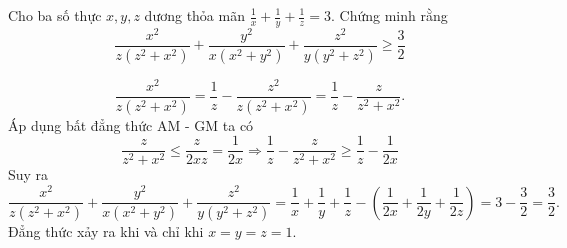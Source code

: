 \begin{problem}
	Cho ba số thực $x, y, z$ dương thỏa mãn $\displaystyle \frac{1}{x} + \frac{1}{y} + \frac{1}{z} = 3$. Chứng minh rằng
	\[
		\frac{x^2}{z(z^2 + x^2)} + \frac{y^2}{x(x^2+ y^2)} + \frac{z^2}{y(y^2 + z^2)} \ge \frac{3}{2}
	\]
	\solution

	\[
		\frac{x^2}{z(z^2 + x^2)} = \frac{1}{z} - \frac{z^2}{z(z^2 + x^2)} = \frac{1}{z} - \frac{z}{z^2 + x^2}.
	\]
	Áp dụng bất đẳng thức AM - GM ta có
	\[
		\frac{z}{z^2 + x^2} \le \frac{z}{2xz} = \frac{1}{2x} \Rightarrow 
		\frac{1}{z} - \frac{z}{z^2 + x^2} \ge \frac{1}{z} - \frac{1}{2x}
	\]
	Suy ra
	\[
		\frac{x^2}{z(z^2 + x^2)} + \frac{y^2}{x(x^2+ y^2)} + \frac{z^2}{y(y^2 + z^2)}
		= \frac{1}{x} + \frac{1}{y} + \frac{1}{z} - \left(\frac{1}{2x} + \frac{1}{2y} + \frac{1}{2z}\right) = 3 - \frac{3}{2} = \frac{3}{2}.
	\]
	Đẳng thức xảy ra khi và chỉ khi $x = y = z = 1$.

\end{problem}